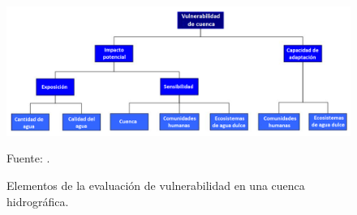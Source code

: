 \begin{figure}
	\includegraphics[scale=0.8]{Images/Nelitz01.png}
	\centering
	\caption{Elementos de la evaluación de vulnerabilidad en una cuenca hidrográfica.}
	Fuente: \citet{nelitz2013tools}.
    \label{fig:Nelitz01}
\end{figure}
